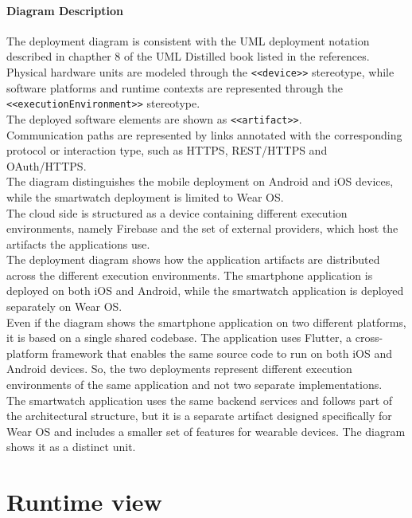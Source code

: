 \paragraph{Diagram Description}
The deployment diagram is consistent with the UML deployment notation described in chapther 8 of the UML Distilled book listed in the references. \\
Physical hardware units are modeled through the \texttt{<<device>>} stereotype, while software platforms and runtime contexts are represented through the \texttt{<<executionEnvironment>>} stereotype.  \\
The deployed software elements are shown as \texttt{<<artifact>>}. \\
Communication paths are represented by links annotated with the corresponding protocol or interaction type, such as HTTPS, REST/HTTPS and OAuth/HTTPS. \\
The diagram distinguishes the mobile deployment on Android and iOS devices, while the smartwatch deployment is limited to Wear OS. \\
The cloud side is structured as a device containing different execution environments, namely Firebase and the set of external providers, which host the artifacts the applications use. \\
The deployment diagram shows how the application artifacts are distributed across the different execution environments. The smartphone application is deployed on both iOS and Android, while the smartwatch application is deployed separately on Wear OS.  \\
Even if the diagram shows the smartphone application on two different platforms, it is based on a single shared codebase. The application uses Flutter, a cross-platform framework that enables the same source code to run on both iOS and Android devices. So, the two deployments represent different execution environments of the same application and not two separate implementations. \\
The smartwatch application uses the same backend services and follows part of the architectural structure, but it is  a separate artifact designed specifically for Wear OS and includes a smaller set of features for wearable devices. The diagram shows it as a distinct unit. \\

\newpage

\section{Runtime view} \label{Runtime view} 

